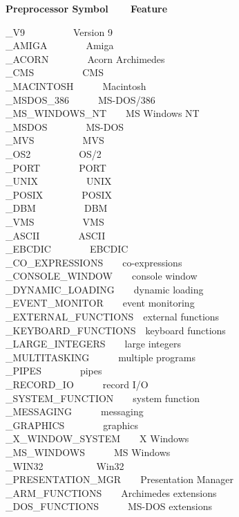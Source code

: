 {\bfseries
Preprocessor Symbol\ \ \ \ Feature}

\_V9\ \ \ \ \ \ \ \ \ \ Version 9\\
\_AMIGA\ \ \ \ \ \ \ \ Amiga\\
\_ACORN\ \ \ \ \ \ \ \ Acorn Archimedes\\
\_CMS\ \ \ \ \ \ \ \ \ \ CMS\\
\_MACINTOSH\ \ \ \ \ \ Macintosh\\
\_MSDOS\_386\ \ \ \ \ \ MS-DOS/386\\
\_MS\_WINDOWS\_NT\ \ \ \ MS Windows NT\\
\_MSDOS\ \ \ \ \ \ \ \ MS-DOS\\
\_MVS\ \ \ \ \ \ \ \ \ \ MVS\\
\_OS2\ \ \ \ \ \ \ \ \ \ OS/2\\
\_PORT\ \ \ \ \ \ \ \ PORT\\
\_UNIX\ \ \ \ \ \ \ \ \ \ UNIX\\
\_POSIX\ \ \ \ \ \ \ \ POSIX\\
\_DBM\ \ \ \ \ \ \ \ \ \ DBM\\
\_VMS\ \ \ \ \ \ \ \ \ \ VMS\\
\_ASCII\ \ \ \ \ \ \ \ ASCII\\
\_EBCDIC\ \ \ \ \ \ \ \ EBCDIC\\
\_CO\_EXPRESSIONS\ \ \ \ co-expressions\\
\_CONSOLE\_WINDOW\ \ \ \ console window\\
\_DYNAMIC\_LOADING\ \ \ \ dynamic loading\\
\_EVENT\_MONITOR\ \ \ \ event monitoring\\
\_EXTERNAL\_FUNCTIONS\ \ external functions\\
\_KEYBOARD\_FUNCTIONS\ \ keyboard functions\\
\_LARGE\_INTEGERS\ \ \ \ large integers\\
\_MULTITASKING\ \ \ \ \ \ multiple programs\\
\_PIPES\ \ \ \ \ \ \ \ pipes\\
\_RECORD\_IO\ \ \ \ \ \ record I/O\\
\_SYSTEM\_FUNCTION\ \ \ \ system function\\
\_MESSAGING\ \ \ \ \ \ messaging\\
\_GRAPHICS\ \ \ \ \ \ \ \ graphics\\
\_X\_WINDOW\_SYSTEM\ \ \ \ X Windows\\
\_MS\_WINDOWS\ \ \ \ \ \ MS Windows\\
\_WIN32\ \ \ \ \ \ \ \ \ \ \ Win32\\
\_PRESENTATION\_MGR\ \ \ \ Presentation Manager\\
\_ARM\_FUNCTIONS\ \ \ \ Archimedes extensions\\
\_DOS\_FUNCTIONS\ \ \ \ \ \ MS-DOS extensions

